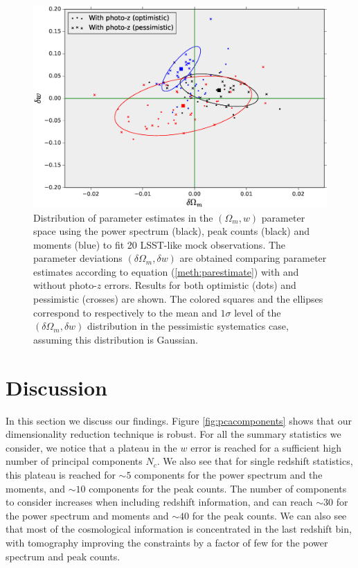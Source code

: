 \documentclass[reprint,aps,prd,superscriptaddress,showkeys,showpacs]{revtex4-1}
\begin{document}
\begin{figure}
\includegraphics[scale=0.3]{Figures/photoz_bias.eps}
\caption{Distribution of parameter estimates in the $(\Omega_m,w)$ parameter space using the power spectrum (black), peak counts (black) and moments (blue) to fit 20 LSST-like mock observations. The parameter deviations $(\delta\Omega_m,\delta w)$ are obtained comparing parameter estimates according to equation (\ref{meth:parestimate}) with and without photo-$z$ errors. Results for both optimistic (dots) and pessimistic (crosses) are shown. The colored squares and the ellipses correspond to respectively to the mean and $1\sigma$ level of the $(\delta\Omega_m,\delta w)$ distribution in the pessimistic systematics case, assuming this distribution is Gaussian.}
\label{fig:photozbias}
\end{figure}


\section{Discussion}
In this section we discuss our findings. Figure \ref{fig:pcacomponents} shows that our dimensionality reduction technique is robust. For all the summary statistics we consider, we notice that a plateau in the $w$ error is reached for a sufficient high number of principal components $N_c$. We also see that for single redshift statistics, this plateau is reached for $\sim 5$ components for the power spectrum and the moments, and $\sim 10$ components for the peak counts. The number of components to consider increases when including redshift information, and can reach $\sim 30$ for the power spectrum and moments and $\sim 40$ for the peak counts. We can also see that most of the cosmological information is concentrated in the last redshift bin, with tomography improving the constraints by a factor of few for the power spectrum and peak counts.
\end{document}
